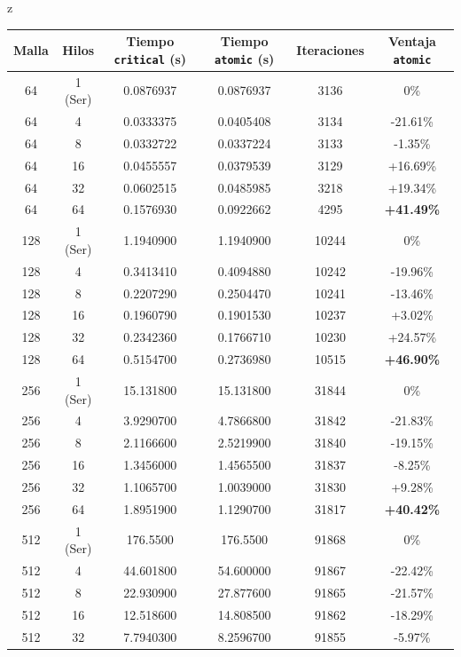 z\documentclass[11pt,a4paper]{article}
\begin{document}
\begin{table}[H]
\centering
\renewcommand{\arraystretch}{1.2}
\small
\begin{tabular}{|c|c|c|c|c|c|}
\hline
\textbf{Malla} & \textbf{Hilos} & \textbf{Tiempo \texttt{critical} (s)} & \textbf{Tiempo \texttt{atomic} (s)} & \textbf{Iteraciones} & \textbf{Ventaja \texttt{atomic}} \\ \hline
64 & 1 (Ser) & 0.0876937 & 0.0876937 & 3136 & 0\% \\ 
64 & 4 & 0.0333375 & 0.0405408 & 3134 & -21.61\% \\ 
64 & 8 & 0.0332722 & 0.0337224 & 3133 & -1.35\% \\ 
64 & 16 & 0.0455557 & 0.0379539 & 3129 & +16.69\% \\ 
64 & 32 & 0.0602515 & 0.0485985 & 3218 & +19.34\% \\ 
64 & 64 & 0.1576930 & 0.0922662 & 4295 & \textbf{+41.49\%} \\ \hline
128 & 1 (Ser) & 1.1940900 & 1.1940900 & 10244 & 0\% \\ 
128 & 4 & 0.3413410 & 0.4094880 & 10242 & -19.96\% \\ 
128 & 8 & 0.2207290 & 0.2504470 & 10241 & -13.46\% \\ 
128 & 16 & 0.1960790 & 0.1901530 & 10237 & +3.02\% \\ 
128 & 32 & 0.2342360 & 0.1766710 & 10230 & +24.57\% \\ 
128 & 64 & 0.5154700 & 0.2736980 & 10515 & \textbf{+46.90\%} \\ \hline
256 & 1 (Ser) & 15.131800 & 15.131800 & 31844 & 0\% \\ 
256 & 4 & 3.9290700 & 4.7866800 & 31842 & -21.83\% \\ 
256 & 8 & 2.1166600 & 2.5219900 & 31840 & -19.15\% \\ 
256 & 16 & 1.3456000 & 1.4565500 & 31837 & -8.25\% \\ 
256 & 32 & 1.1065700 & 1.0039000 & 31830 & +9.28\% \\ 
256 & 64 & 1.8951900 & 1.1290700 & 31817 & \textbf{+40.42\%} \\ \hline
512 & 1 (Ser) & 176.5500 & 176.5500 & 91868 & 0\% \\ 
512 & 4 & 44.601800 & 54.600000 & 91867 & -22.42\% \\ 
512 & 8 & 22.930900 & 27.877600 & 91865 & -21.57\% \\ 
512 & 16 & 12.518600 & 14.808500 & 91862 & -18.29\% \\ 
512 & 32 & 7.7940300 & 8.2596700 & 91855 & -5.97\% \\ 

\end{tabular}
\end{table}
\end{document}
